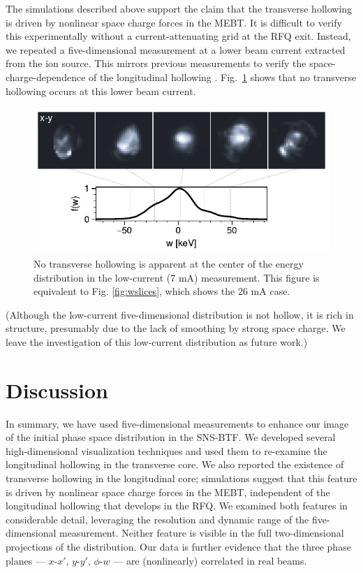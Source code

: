 \documentclass[%
 reprint,
 amsmath,amssymb,
 aps,
prstab,
]{revtex4-2}
\begin{document}
The simulations described above support the claim that the transverse hollowing is driven by nonlinear space charge forces in the MEBT. It is difficult to verify this experimentally without a current-attenuating grid at the RFQ exit. Instead, we repeated a five-dimensional measurement at a lower beam current extracted from the ion source. This mirrors previous measurements to verify the space-charge-dependence of the longitudinal hollowing \cite{Cathey2018}. Fig.~\ref{fig:wslices_low_current} shows that no transverse hollowing occurs at this lower beam current.
%
\begin{figure}
    \centering
    \includegraphics[width=\columnwidth]{fig11.pdf}
    \caption{No transverse hollowing is apparent at the center of the energy distribution in the low-current (7 mA) measurement. This figure is equivalent to Fig. \ref{fig:wslices}, which shows the 26 mA case.}
    \label{fig:wslices_low_current}
\end{figure}
%
(Although the low-current five-dimensional distribution is not hollow, it is rich in structure, presumably due to the lack of smoothing by strong space charge. We leave the investigation of this low-current distribution as future work.)



\section{Discussion}\label{sec:discussion}

In summary, we have used five-dimensional measurements to enhance our image of the initial phase space distribution in the SNS-BTF. We developed several high-dimensional visualization techniques and used them to re-examine the longitudinal hollowing in the transverse core. We also reported the existence of transverse hollowing in the longitudinal core; simulations suggest that this feature is driven by nonlinear space charge forces in the MEBT, independent of the longitudinal hollowing that develops in the RFQ. We examined both features in considerable detail, leveraging the resolution and dynamic range of the five-dimensional measurement. Neither feature is visible in the full two-dimensional projections of the distribution. Our data is further evidence that the three phase planes --- $x$-$x'$, $y$-$y'$, $\phi$-$w$ --- are (nonlinearly) correlated in real beams.
\end{document}

